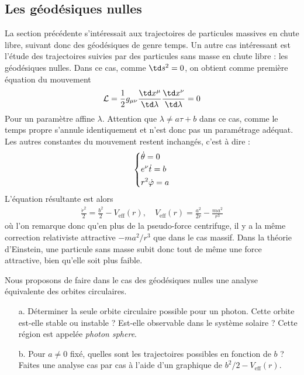\subsection{Les géodésiques nulles}
La section précédente s'intéressait aux trajectoires de particules massives en chute libre, suivant donc des géodésiques de genre temps. Un autre cas intéressant est l'étude des trajectoires suivies par des particules sans masse en chute libre : les géodésiques nulles. Dans ce cas, comme $\td s^2 = 0$, on obtient comme première équation du mouvement
\begin{equation}
    \mathcal{L} = \frac{1}{2} g_{\mu\nu} \frac{\td x^\mu}{\td \lambda} \frac{\td x^\nu}{\td \lambda} = 0
\end{equation}
Pour un paramètre affine $\lambda$. Attention que $\lambda \neq a\tau +b$ dans ce cas, comme le temps propre s'annule identiquement et n'est donc pas un paramétrage adéquat. Les autres constantes du mouvement restent inchangés, c'est à dire :
\begin{align}
    \begin{dcases}
        \dot{\theta} = 0 \\
        e^\nu \dot{t} = b \\
        r^2 \dot{\varphi} = a
    \end{dcases}
\end{align}
L'équation résultante est alors
\begin{align}
    \label{Géodésiques nulles de Schwarzschild}
    \boxed{\frac{\dot{r}^2}{2} = \frac{b^2}{2} - V_\text{eff} (r), \quad V_\text{eff} (r) = \frac{a^2}{2r} - \frac{ma^2}{r^3}}
\end{align}
où l'on remarque donc qu'en plus de la pseudo-force centrifuge, il y a la même correction relativiste attractive $-ma^2/r^3$ que dans le cas massif. Dans la théorie d'Einstein, une particule sans masse subit donc tout de même une force attractive, bien qu'elle soit plus faible.
\begin{exerc}
    Nous proposons de faire dans le cas des géodésiques nulles une analyse équivalente des orbites circulaires.
    \begin{enumerate}
        \item[a.] Déterminer la seule orbite circulaire possible pour un photon. Cette orbite est-elle stable ou instable ? Est-elle observable dans le système solaire ? Cette région est appelée \emph{photon sphere}.
        \item[b.] Pour $a \neq 0$ fixé, quelles sont les trajectoires possibles en fonction de $b$ ? Faites une analyse cas par cas à l'aide d'un graphique de $b^2/2 - V_\text{eff}(r)$.
    \end{enumerate}
\end{exerc}
